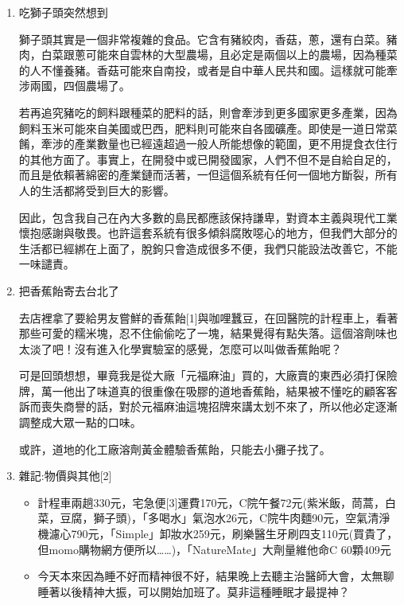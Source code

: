 \documentclass[a5paper, 12pt
]{book}
\providecommand{\tightlist}{%
  \setlength{\itemsep}{0pt}\setlength{\parskip}{0pt}}
\begin{document}
\begin{enumerate}
\def\labelenumi{\arabic{enumi}.}
\item
  吃獅子頭突然想到

  獅子頭其實是一個非常複雜的食品。它含有豬絞肉，香菇，蔥，還有白菜。豬肉，白菜跟蔥可能來自雲林的大型農場，且必定是兩個以上的農場，因為種菜的人不懂養豬。香菇可能來自南投，或者是自中華人民共和國。這樣就可能牽涉兩國，四個農場了。

  若再追究豬吃的飼料跟種菜的肥料的話，則會牽涉到更多國家更多產業，因為飼料玉米可能來自美國或巴西，肥料則可能來自各國礦產。即使是一道日常菜餚，牽涉的產業數量也已經遠超過一般人所能想像的範圍，更不用提食衣住行的其他方面了。事實上，在開發中或已開發國家，人們不但不是自給自足的，而且是依賴著綿密的產業鏈而活著，一但這個系統有任何一個地方斷裂，所有人的生活都將受到巨大的影響。

  因此，包含我自己在內大多數的島民都應該保持謙卑，對資本主義與現代工業懷抱感謝與敬畏。也許這套系統有很多傾斜腐敗噁心的地方，但我們大部分的生活都已經綁在上面了，脫鉤只會造成很多不便，我們只能設法改善它，不能一味譴責。
\item
  把香蕉飴寄去台北了

  去店裡拿了要給男友嘗鮮的香蕉飴{[}1{]}與咖哩蠶豆，在回醫院的計程車上，看著那些可愛的糯米塊，忍不住偷偷吃了一塊，結果覺得有點失落。這個溶劑味也太淡了吧！沒有進入化學實驗室的感覺，怎麼可以叫做香蕉飴呢？

  可是回頭想想，畢竟我是從大廠「元福麻油」買的，大廠賣的東西必須打保險牌，萬一他出了味道真的很重像在吸膠的道地香蕉飴，結果被不懂吃的顧客客訴而喪失商譽的話，對於元福麻油這塊招牌來講太划不來了，所以他必定逐漸調整成大眾一點的口味。

  或許，道地的化工廠溶劑黃金體驗香蕉飴，只能去小攤子找了。
\item
  雜記:物價與其他{[}2{]}

  \begin{itemize}
  \tightlist
  \item
    計程車兩趟330元，宅急便{[}3{]}運費170元，C院午餐72元(紫米飯，茼蒿，白菜，豆腐，獅子頭)，「多喝水」氣泡水26元，C院牛肉麵90元，空氣清淨機濾心790元，「Simple」卸妝水259元，刷樂醫生牙刷四支110元(買貴了，但momo購物網方便所以\ldots\ldots)，「NatureMate」大劑量維他命C
    60顆409元
  \item
    今天本來因為睡不好而精神很不好，結果晚上去聽主治醫師大會，太無聊睡著以後精神大振，可以開始加班了。莫非這種睡眠才最提神？
  \end{itemize}
\end{enumerate}
\end{document}

